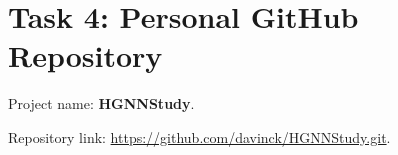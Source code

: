
\section*{Task 4: Personal GitHub Repository}
Project name: \textbf{HGNNStudy}.\par
Repository link: \url{https://github.com/davinck/HGNNStudy.git}.\par
